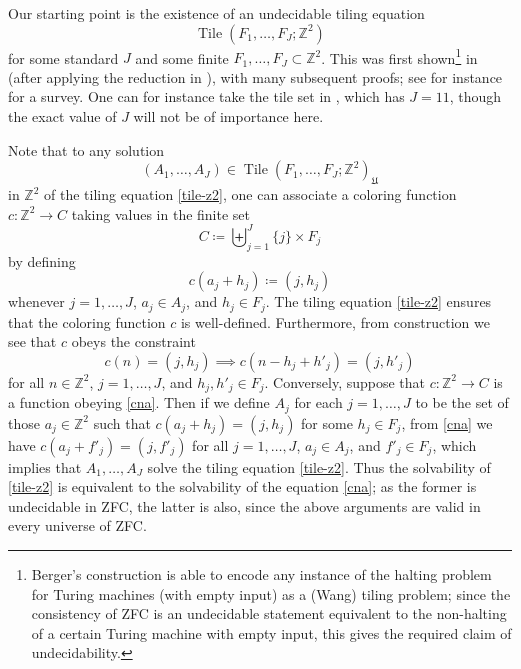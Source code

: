 \documentclass[reqno,a4paper,12pt]{amsart}
\numberwithin{equation}{section}
\numberwithin{figure}{section}
\def\Z{\mathbb{Z}}
\newcommand{\Tile}{\operatorname{Tile}}
\newcommand{\Universe}{{\mathfrak{U}}}
\theoremstyle{plain}
\theoremstyle{definition}
\begin{document}
Our starting point is the existence of an undecidable tiling equation
\begin{equation}\label{tile-z2}
 \Tile(F_1,\dots,F_J; \Z^2)
\end{equation}
for some standard $J$ and some finite $F_1,\dots,F_J \subset \Z^2$.  This was first shown\footnote{\label{berfoot}Berger's construction is able to encode any instance of the halting problem for Turing machines (with empty input) as a (Wang) tiling problem; since the consistency of ZFC is an undecidable statement equivalent to the non-halting of a certain Turing machine with empty input, this gives the required claim of undecidability.} in \cite{Ber} (after applying the reduction in \cite{golomb}), with many subsequent proofs; see for instance \cite{jv} for a survey. One can for instance take the tile set in \cite{ollinger-2}, which has $J = 11$, though the exact value of $J$ will not be of importance here.  

Note that to any solution 
$$(A_1,\dots,A_J) \in \Tile(F_1,\dots,F_J;\Z^2)_\Universe$$
in $\Z^2$ of the tiling equation \eqref{tile-z2}, one can associate a coloring function $c \colon \Z^2 \to C$ taking values in the finite set
$$ C \coloneqq \biguplus_{j=1}^J \{j\} \times F_j$$
by defining
$$ c(a_j + h_j) \coloneqq (j, h_j)$$
whenever $j=1,\dots,J$, $a_j \in A_j$, and $h_j \in F_j$.  The tiling equation \eqref{tile-z2} ensures that the coloring function $c$ is well-defined.  Furthermore, from construction we see that $c$ obeys the constraint
\begin{equation}\label{cna}
c(n) = (j,h_j) \implies c(n-h_j+h'_j) = (j,h'_j)
\end{equation}
for all $n \in \Z^2$, $j=1,\dots,J$, and $h_j, h'_j \in F_j$.  Conversely, suppose that $c \colon \Z^2 \to C$ is a function obeying \eqref{cna}.  Then if we define $A_j$ for each $j=1,\dots,J$ to be the set of those $a_j \in \Z^2$ such that $c(a_j+h_j) = (j,h_j)$ for some $h_j \in F_j$, from \eqref{cna} we have $c(a_j+f'_j) = (j,f'_j)$ for all $j=1,\dots,J$, $a_j \in A_j$, and $f'_j \in F_j$, which implies that $A_1,\dots,A_J$ solve the tiling equation \eqref{tile-z2}.  Thus the solvability of \eqref{tile-z2} is equivalent to the solvability of the equation \eqref{cna}; as the former is undecidable in ZFC, the latter is also, since the above arguments are valid in every universe of ZFC.
\end{document}
